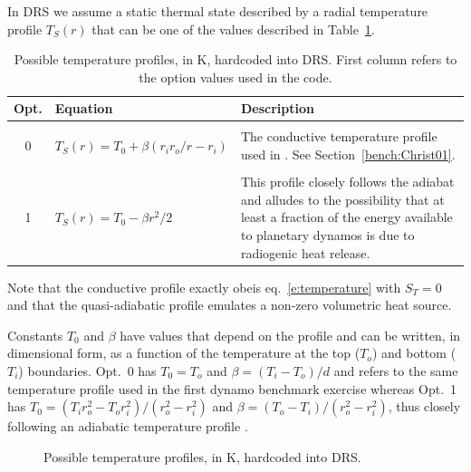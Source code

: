 \documentclass[a4paper,10pt]{book}
\begin{document}
In DRS we assume a static thermal state described by a radial temperature
profile $T_S (r)$ that can be one of the values described in
Table~\ref{t:t_profiles}.
\begin{table}[htb]
\centering
\begin{tabular}{|c|lp{}|}\hline
 Opt. & Equation & Description\\\hline
  &                          & \\
 0&$T_S(r) = T_0 + \beta(r_i r_o/r - r_i)$ & The conductive temperature
 profile used in \citep{ChristensenEtAl01}. See Section~\ref{bench:Christ01}.
 \\\hline
  &                          & \\
 1&$T_S(r) = T_0 - \beta r^2/2$    & This profile closely
follows the adiabat \citep{LabrossePoirier1997,DaviesGubbins2011} and alludes to
the possibility that at least a fraction of the energy available to planetary
dynamos is due to radiogenic heat release. \\ \hline
\end{tabular}
\caption{Possible temperature profiles, in K, hardcoded into DRS. First column
refers to the option values used in the code.}
\label{t:t_profiles}
\end{table}
Note that the conductive profile exactly obeis eq.~\ref{e:temperature} with
$S_T=0$ and that the quasi-adiabatic profile emulates a non-zero volumetric
heat source.

Constants $T_0$ and $\beta$ have values that depend on the profile and can be
written, in dimensional form, as a function of the temperature at the top
($T_o$) and bottom ($T_i$) boundaries. Opt.~0 has $T_0 = T_o$ and $\beta = (T_i
-T_o)/d$ and refers to the same temperature profile used in the first dynamo
benchmark exercise \citep{ChristensenEtAl01} whereas Opt.~1 has $T_0 = (T_i
r_o^2 - T_o r_i^2)/(r_o^2 - r_i^2)$ and $\beta = (T_o - T_i)/(r_o^2 - r_i^2)$,
thus closely following an adiabatic temperature profile
\citep{LabrossePoirier1997, DaviesGubbins2011}.
\begin{figure}[htb]
\centering 
 \caption{Possible temperature profiles, in K, hardcoded into DRS.}
\end{figure}
\end{document}
